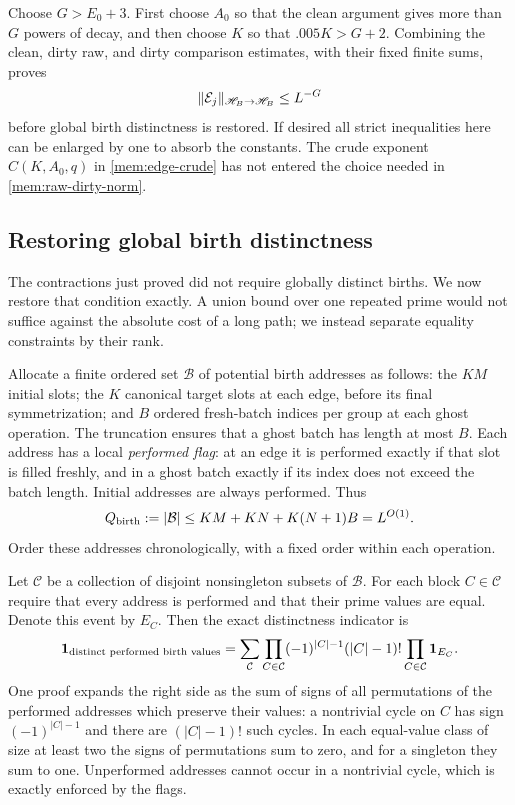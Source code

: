 Choose $G>E_0+3$. First choose $A_0$ so that the clean argument gives
more than $G$ powers of decay, and then choose $K$ so that
$.005K>G+2$. Combining the clean, dirty raw, and dirty comparison
estimates, with their fixed finite sums, proves
\begin{equation}\label{mem:signed-edge}
 \lVert\mathcal E_j\rVert_{\mathscr H_B\to\mathscr H_B}\le L^{-G}
\end{equation}
before global birth distinctness is restored. If desired all strict
inequalities here can be enlarged by one to absorb the constants.
The crude exponent $C(K,A_0,q)$ in \eqref{mem:edge-crude} has not
entered the choice needed in \eqref{mem:raw-dirty-norm}.

\subsection{Restoring global birth distinctness}

The contractions just proved did not require globally distinct births.
We now restore that condition exactly. A union bound over one repeated
prime would not suffice against the absolute cost of a long path;
we instead separate equality constraints by their rank.

Allocate a finite ordered set $\mathcal B$ of potential birth
addresses as follows: the $KM$ initial slots; the $K$ canonical target
slots at each edge, before its final symmetrization; and $B$ ordered
fresh-batch indices per group at each ghost operation. The truncation
ensures that a ghost batch has length at most $B$. Each address has
a local \emph{performed flag}: at an edge it is performed exactly if
that slot is filled freshly, and in a ghost batch exactly if its index
does not exceed the batch length. Initial addresses are always
performed. Thus
\begin{equation}\label{mem:address-count}
 Q_{\mathrm{birth}}:=\lvert\mathcal B\rvert
       \le KM+KN+K(N+1)B=L^{O(1)}.
\end{equation}
Order these addresses chronologically, with a fixed order within
each operation.

Let $\mathcal C$ be a collection of disjoint nonsingleton subsets of
$\mathcal B$. For each block $C\in\mathcal C$ require that every
address is performed and that their prime values are equal. Denote
this event by $E_C$. Then the exact distinctness indicator is
\begin{equation}\label{mem:partition-identity}
 \mathbf{1}_{\text{distinct performed birth values}}
 =\sum_{\mathcal C}
       \prod_{C\in\mathcal C}(-1)^{|C|-1}(|C|-1)!
       \prod_{C\in\mathcal C}\mathbf{1}_{E_C}.
\end{equation}
One proof expands the right side as the sum of signs of all
permutations of the performed addresses which preserve their values:
a nontrivial cycle on $C$ has sign $(-1)^{|C|-1}$ and there are
$(|C|-1)!$ such cycles. In each equal-value class of size at least two
the signs of permutations sum to zero, and for a singleton they sum
to one. Unperformed addresses cannot occur in a nontrivial cycle,
which is exactly enforced by the flags.

